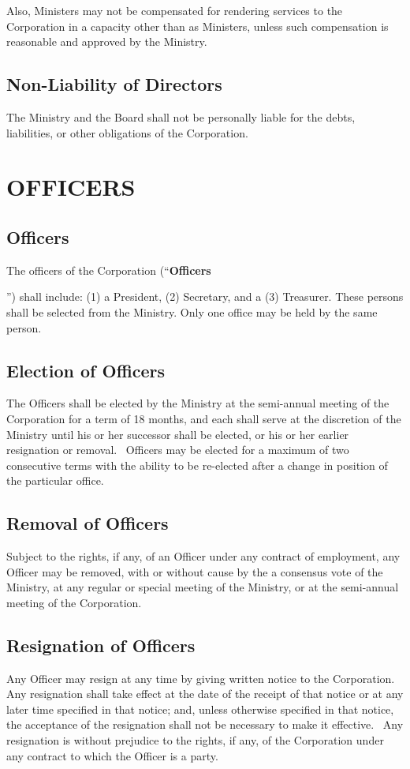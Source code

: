 \documentclass[letterpaper,titlepage]{article}
\newcommand{\defn}[1]{\refstepcounter{defn}\textbf{#1}\addcontentsline{defn}{defn}{\protect\numberline{\thedefn}#1}}
\begin{document}
Also, Ministers may not be compensated for rendering services to the
Corporation in a capacity other than as Ministers, unless such compensation is
reasonable and approved by the Ministry.
\subsection{Non-Liability of Directors}
\label{sec:nonliability}
The Ministry and the Board shall not be personally liable for the debts,
liabilities, or other obligations of the Corporation.
\section{OFFICERS}
\label{sec:officers}
\subsection{Officers}
\label{sec:officers2}
The officers of the Corporation (``\defn{Officers}'') shall include: (1) a
President, (2) Secretary, and a (3) Treasurer. These persons shall be selected
from the Ministry. Only one office may be held by the same person.
\subsection{Election of Officers}
\label{sec:electionOfficers}
The Officers shall be elected by the Ministry at the semi-annual meeting of the
Corporation for a term of 18 months, and each shall serve at the discretion of
the Ministry until his or her successor shall be elected, or his or her earlier
resignation or removal.  Officers may be elected for a maximum of two
consecutive terms with the ability to be re-elected after a change in position
of the particular office. 
\subsection{Removal of Officers}
\label{sec:removalOfficers}
Subject to the rights, if any, of an Officer under any contract of employment,
any Officer may be removed, with or without cause by the a consensus vote of
the  Ministry, at any regular or special meeting of the Ministry, or at the
semi-annual meeting of the Corporation.
\subsection{Resignation of Officers}
\label{sec:resignationOfficers}
Any Officer may resign at any time by giving written notice to the
Corporation.  Any resignation shall take effect at the date of the receipt of
that notice or at any later time specified in that notice; and, unless
otherwise specified in that notice, the acceptance of the resignation shall not
be necessary to make it effective.  Any resignation is without prejudice to the
rights, if any, of the Corporation under any contract to which the Officer is a
party.
\end{document}
